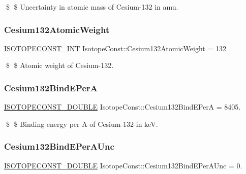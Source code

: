 \$ \$ Uncertainty in atomic mass of Cesium-\/132 in amu. \mbox{\label{group___isotope_const-_cesium-_cs132_gafecd59e1c99597a09479d1a4425c550f}} 
\subsubsection{\texorpdfstring{Cesium132\+Atomic\+Weight}{Cesium132AtomicWeight}}
{\footnotesize\ttfamily \mbox{\hyperlink{group___isotope_const-_macros_ga5f18360b3e99483a35c32d789e62621c}{I\+S\+O\+T\+O\+P\+E\+C\+O\+N\+S\+T\+\_\+\+I\+NT}} Isotope\+Const\+::\+Cesium132\+Atomic\+Weight = 132}

\$ \$ Atomic weight of Cesium-\/132. \mbox{\label{group___isotope_const-_cesium-_cs132_ga061006d5c178048ad294f316de4ee38c}} 
\subsubsection{\texorpdfstring{Cesium132\+Bind\+E\+PerA}{Cesium132BindEPerA}}
{\footnotesize\ttfamily \mbox{\hyperlink{group___isotope_const-_macros_ga8f45a7272ce02c0b4c65c44636ed719a}{I\+S\+O\+T\+O\+P\+E\+C\+O\+N\+S\+T\+\_\+\+D\+O\+U\+B\+LE}} Isotope\+Const\+::\+Cesium132\+Bind\+E\+PerA = 8405.}

\$ \$ Binding energy per A of Cesium-\/132 in keV. \mbox{\label{group___isotope_const-_cesium-_cs132_gadb864b8bfb6d12631fd892d5b1439730}} 
\subsubsection{\texorpdfstring{Cesium132\+Bind\+E\+Per\+A\+Unc}{Cesium132BindEPerAUnc}}
{\footnotesize\ttfamily \mbox{\hyperlink{group___isotope_const-_macros_ga8f45a7272ce02c0b4c65c44636ed719a}{I\+S\+O\+T\+O\+P\+E\+C\+O\+N\+S\+T\+\_\+\+D\+O\+U\+B\+LE}} Isotope\+Const\+::\+Cesium132\+Bind\+E\+Per\+A\+Unc = 0.}

